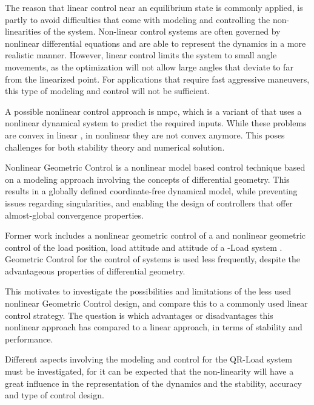 The reason that linear control near an equilibrium state is commonly applied, is partly to avoid difficulties that come with modeling and controlling the non-linearities of the system. Non-linear control systems are often governed by nonlinear differential equations and are able to represent the dynamics in a more realistic manner. However, linear control limits the system to small angle movements, as the optimization will not allow large angles that deviate to far from the linearized point. For applications that require fast aggressive maneuvers, this type of modeling and control will not be sufficient.

A possible nonlinear control approach is \acs{nmpc}, which is a variant of  that uses a nonlinear dynamical system to predict the required inputs. While these problems are convex in linear , in nonlinear  they are not convex anymore. This poses challenges for both  stability theory and numerical solution.

Nonlinear Geometric Control is a nonlinear model based control technique based on a modeling approach involving the concepts of differential geometry. This results in a globally defined coordinate-free dynamical model, while preventing issues regarding singularities, and enabling the design of controllers that offer almost-global convergence properties.

Former work includes a nonlinear geometric  control of a  \cite{Goodarzi2013a} and nonlinear geometric control of the load position, load attitude and  attitude of a -Load system \cite{Sreenath2013b,Tang2015}.
Geometric Control for the control of  systems is used less frequently, despite the advantageous properties of differential geometry. 

This motivates to investigate the possibilities and limitations of the less used nonlinear Geometric Control design, and compare this to a commonly used linear control strategy.
The question is which advantages or disadvantages this nonlinear approach has compared to a linear approach, in terms of stability and performance.



Different aspects involving the modeling and control for the QR-Load system must be investigated, for it can be expected that the non-linearity will have a great influence in the representation of the dynamics and the stability, accuracy and type of control design.

